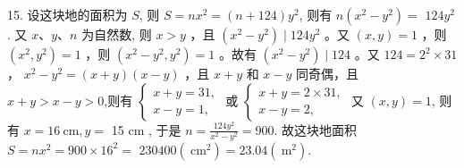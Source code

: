 \documentclass[10pt]{article}
\begin{document}
15. 设这块地的面积为 $S$, 则 $S=n x^{2}=(n+124) y^{2}$, 则有 $n\left(x^{2}-y^{2}\right)=$ $124 y^{2}$. 又 $x 、 y 、 n$ 为自然数, 则 $x>y$ ，且 $\left(x^{2}-y^{2}\right) \mid 124 y^{2}$ 。又 $(x, y)=1$ ，则 $\left(x^{2}, y^{2}\right)=1$ ，则 $\left(x^{2}-y^{2}, y^{2}\right)=1$ 。故有 $\left(x^{2}-y^{2}\right) \mid 124$ 。又 $124=2^{2} \times 31$ ， $x^{2}-y^{2}=(x+y)(x-y)$ ，且 $x+y$ 和 $x-y$ 同奇偶，且 $x+y>x-y>0$,则有 $\left\{\begin{array}{l}x+y=31, \\ x-y=1,\end{array}\right.$ 或 $\left\{\begin{array}{l}x+y=2 \times 31, \\ x-y=2,\end{array}\right.$ 又 $(x, y)=1$, 则有 $x=16 \mathrm{~cm}, y=$ 15 cm , 于是 $n=\frac{124 y^{2}}{x^{2}-y^{2}}=900$. 故这块地面积 $S=n x^{2}=900 \times 16^{2}=$ $230400\left(\mathrm{~cm}^{2}\right)=23.04\left(\mathrm{~m}^{2}\right)$.
\end{document}
